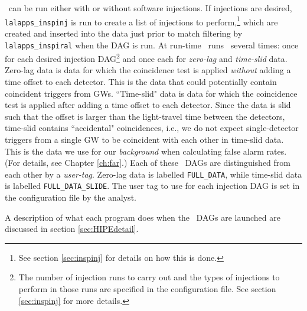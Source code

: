 \hipe~can be run either with or without software injections. If injections are
desired, \texttt{lalapps\_inspinj} is run to create a list of injections to
perform,\footnote{See section \ref{sec:inspinj} for details on how this is
done.} which are created and inserted into the data just prior to match
filtering by \texttt{lalapps\_inspiral} \cite{brown-2005-22} when the \ac{DAG}
is run. At run-time \ihope~runs \hipe~several times: once for each desired
injection \ac{DAG}\footnote{The number of injection runs to carry out and the
types of injections to perform in those runs are specified in the configuration
file.  See section \ref{sec:inspinj} for more details.} and once each for
\emph{zero-lag} and \emph{time-slid} data. Zero-lag data is data for which the
coincidence test is applied \emph{without} adding a time offset to each
detector. This is the data that could potentially contain coincident triggers
from \acp{GW}.  ``Time-slid" data is data for which the coincidence test is
applied after adding a time offset to each detector. Since the data is slid
such that the offset is larger than the light-travel time between the
detectors, time-slid contains ``accidental" coincidences, i.e., we do not
expect single-detector triggers from a single \ac{GW} to be coincident with
each other in time-slid data. This is the data we use for our \emph{background}
when calculating false alarm rates. (For details, see Chapter \ref{ch:far}.) Each
of these \hipe~\acp{DAG} are distinguished from each other by a
\emph{user-tag}. Zero-lag data is labelled \verb|FULL_DATA|, while time-slid
data is labelled \verb|FULL_DATA_SLIDE|. The user tag to use for each injection
\ac{DAG} is set in the configuration file by the analyst.

A description of what each program does when the \hipe~\acp{DAG} are launched
are discussed in section \ref{sec:HIPEdetail}.

